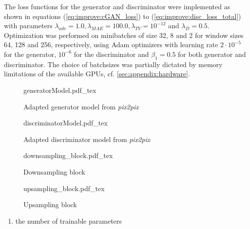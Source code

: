 The loss functions for the generator and discriminator were implemented as shown in equations (\ref{eq:improve:cGAN_loss}) to (\ref{eq:improve:disc_loss_total})
with parameters $\lambda_\mathit{adv}=1.0, \lambda_\mathit{MAE}=100.0, \lambda_\mathit{TV}=10^{-12}$ and $\lambda_D=0.5$.
Optimization was performed on minibatches of size 32, 8 and 2 for window sizes 64, 128 and 256, respectively, 
using Adam optimizers with learning rate $2\cdot10^{-5}$ for the generator, $10^{-6}$ for the discriminator and $\beta_1=0.5$ for both generator and discriminator.
The choice of batchsizes was partially dictated by memory limitations of the available GPUs, cf. \cref{sec:appendix:hardware}.

\begin{figure}[p]
    \tiny
    {generatorModel.pdf_tex}
    \caption{Adapted generator model from \emph{pix2pix}} \label{fig:methods:GAN_arch:generator}
\end{figure}
\begin{figure}[p]
    \scriptsize
    \centering
    {discriminatorModel.pdf_tex}
    \caption{Adapted discriminator model from \emph{pix2pix}} \label{fig:methods:GAN_arch:discriminator}
\end{figure}
\begin{figure}[p]
    \scriptsize
    \centering
    {downsampling_block.pdf_tex}
    \caption{Downsampling block} \label{fig:methods:GAN_arch:downsampling}
\end{figure}
\begin{figure}[p]
    \scriptsize
    \centering
    {upsampling_block.pdf_tex}
    \caption{Upsampling block} \label{fig:methods:GAN_arch:upsampling}
\end{figure}


\begin{enumerate}
 \item the number of trainable parameters \xxx
\end{enumerate}

